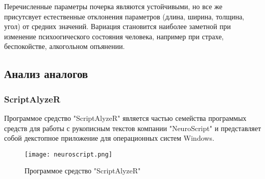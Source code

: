 Перечисленные параметры почерка являются устойчивыми, но все же присутсвует естественные отклонения параметров (длина, ширина, толщина, угол) от средних значений. Вариация становится наиболее заметной при изменение психоогического состояния человека, например при страхе, беспокойстве, алкогольном опъянении.

\subsection{Анализ аналогов}
\label{sub:domain:analogs}

\subsubsection{ScriptAlyzeR}
\label{sub:domain:analogs:neuro_script} 


Программое средство "ScriptAlyzeR" является частью семейства программых средств для работы с рукописным текстов компании "NeuroScript" и представляет собой декстопное приложение для операционных систем Windows.

\begin{figure}[ht]
    \centering
    \label{fig:domain:analogs:neuro_script}
    \texttt{[image: neuroscript.png]}
    \caption{Программое средство "ScriptAlyzeR"}
\end{figure}

